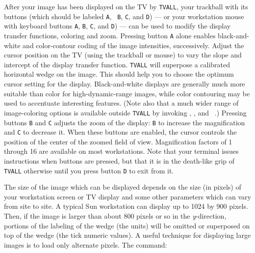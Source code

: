     After your image has been displayed on the TV by {\tt TVALL},
your trackball with its buttons (which should be labeled {\tt A}, {\tt
B}, {\tt C}, and {\tt D}) --- or your workstation mouse with keyboard
buttons {\tt A}, {\tt B}, {\tt C}, and {\tt D}) --- can be used to
modify the display transfer functions, coloring and zoom.  Pressing
button {\tt A} alone enables black-and-white and color-contour coding
of the image intensities, successively.  Adjust the cursor position on
the TV (using the trackball or mouse) to vary the slope and intercept
of the display transfer function.  {\tt TVALL} will superpose a
calibrated horizontal wedge on the image.  This should help you to
choose the optimum cursor setting for the display.  Black-and-white
displays are generally much more suitable than color for
high-dynamic-range images, while color contouring may be used to
accentuate interesting features.  (Note also that a much wider range of
image-coloring options is available outside {\tt TVALL} by invoking
{\tt {}}, {\tt {}}, and {\tt
{}}\@.)  Pressing buttons {\tt B} and {\tt C} adjusts the
zoom of the display: {\tt B} to increase the magnification and {\tt C}
to decrease it.  When these buttons are enabled, the cursor controls
the position of the center of the zoomed field of view.  Magnification
factors of 1 through 16 are available on most workstations.  Note that
your terminal issues instructions when buttons are pressed, but that
it is in the death-like grip of {\tt TVALL} otherwise until you press
button {\tt D} to exit from it.

     The size of the image which can be displayed depends on the size
(in pixels) of your workstation screen or TV display and some other
parameters which can vary from site to site.  A typical Sun
workstation can display up to 1024 by 900 pixels.  Then, if the image
is larger than about 800 pixels or so in the {\it y\/}-direction,
portions of the labeling of the wedge (the units) will be omitted or
superposed on top of the wedge (the tick numeric values).  A useful
technique for displaying large images is to load only alternate
pixels.  The command:

